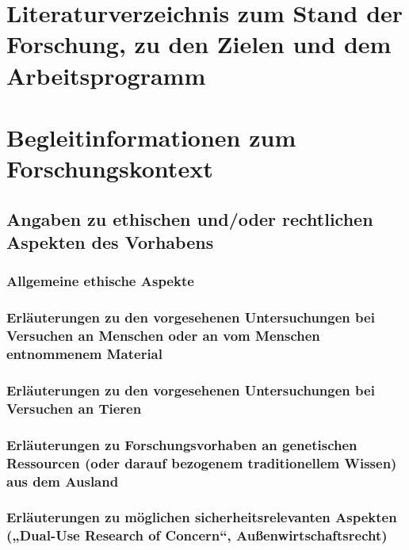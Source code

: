 \documentclass{scrartcl}
\begin{document}
\section{Literaturverzeichnis zum Stand der Forschung, zu den Zielen und dem Arbeitsprogramm}
\label{sec:bib}
\printbibliography[notcategory=reviewed, notcategory=nonreviewed, notcategory=patents_pending, notcategory=patents, heading=none]

\backmatter
\section{Begleitinformationen zum Forschungskontext}

\subsection{Angaben zu ethischen und/oder rechtlichen Aspekten des Vorhabens}

\subsubsection{Allgemeine ethische Aspekte}

\subsubsection{Erläuterungen zu den vorgesehenen Untersuchungen bei Versuchen an 
Menschen oder an vom Menschen entnommenem Material}

\subsubsection{Erläuterungen zu den vorgesehenen Untersuchungen bei Versuchen an Tieren}

\subsubsection{Erläuterungen zu Forschungsvorhaben an genetischen Ressourcen (oder 
darauf bezogenem traditionellem Wissen) aus dem Ausland}

\subsubsection{Erläuterungen zu möglichen sicherheitsrelevanten Aspekten („Dual-Use 
Research of Concern``, Außenwirtschaftsrecht)}
\end{document}
